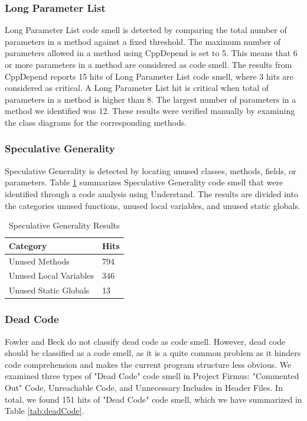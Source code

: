 \subsubsection{Long Parameter List}
Long Parameter List code smell is detected by comparing the total number of parameters in a method against a fixed threshold. The maximum number of parameters allowed in a method using CppDepend is set to 5. This means that 6 or more parameters in a method are considered as code smell. The results from CppDepend reports 15 hits of Long Parameter List code smell, where 3 hits are considered as critical. A Long Parameter List hit is critical when total of parameters in a method is higher than 8. The largest number of parameters in a method we identified was 12. These results were verified manually by examining the class diagrams for the corresponding methods.

\subsubsection{Speculative Generality}
Speculative Generality is detected by locating unused classes, methods, fields, or parameters. Table \ref{tab:speculativeGenerality} summarizes Speculative Generality code smell that were identified through a code analysis using Understand. The results are divided into the categories unused functions, unused local variables, and unused static globals. 

\begin{table}[]
\centering
\caption{Speculative Generality Results}
\label{tab:speculativeGenerality}
\begin{tabular}{|l|l|}
\hline
\textbf{Category}		& 	\textbf{Hits} \\ \hline
Unused Methods 			&	794  \\ \hline
Unused Local Variables 	& 	346	 \\ \hline
Unused Static Globals 	& 	13	 \\ \hline
\end{tabular}
\end{table}



\subsubsection{Dead Code}
Fowler and Beck\cite{1999:RID:311424} do not classify dead code as code smell. However, dead code should be classified as a code smell, as it is a quite common problem as it hinders code comprehension and makes the current program structure less obvious\cite{mantyla2003taxonomy}. We examined three types of "Dead Code" code smell in Project Firmus: "Commented Out" Code, Unreachable Code, and Unnecessary Includes in Header Files. In total, we found 151 hits of "Dead Code" code smell, which we have summarized in Table \ref{tab:deadCode}.

